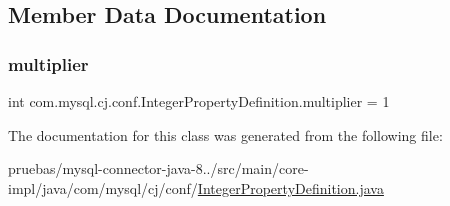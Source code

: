 \subsection{Member Data Documentation}
\mbox{\label{classcom_1_1mysql_1_1cj_1_1conf_1_1_integer_property_definition_ac826198fbf31637b836b1fa754ddfb1c}} 
\subsubsection{\texorpdfstring{multiplier}{multiplier}}
{\footnotesize\ttfamily int com.\+mysql.\+cj.\+conf.\+Integer\+Property\+Definition.\+multiplier = 1\hspace{0.3cm}{\ttfamily [protected]}}



The documentation for this class was generated from the following file\+:\begin{DoxyCompactItemize}
\item 
pruebas/mysql-\/connector-\/java-\/8../src/main/core-\/impl/java/com/mysql/cj/conf/\mbox{\hyperlink{_integer_property_definition_8java}{Integer\+Property\+Definition.\+java}}\end{DoxyCompactItemize}
